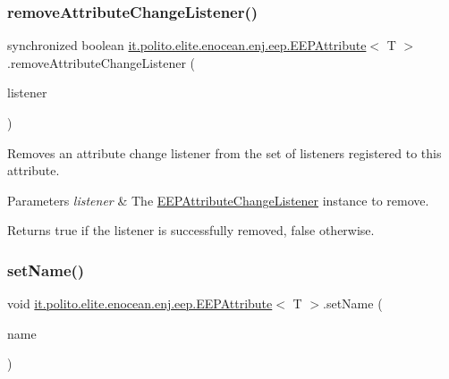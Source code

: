 \subsubsection{\texorpdfstring{remove\+Attribute\+Change\+Listener()}{removeAttributeChangeListener()}}
{\footnotesize\ttfamily synchronized boolean \hyperlink{classit_1_1polito_1_1elite_1_1enocean_1_1enj_1_1eep_1_1_e_e_p_attribute}{it.\+polito.\+elite.\+enocean.\+enj.\+eep.\+E\+E\+P\+Attribute}$<$ T $>$.remove\+Attribute\+Change\+Listener (\begin{DoxyParamCaption}\item[{\hyperlink{interfaceit_1_1polito_1_1elite_1_1enocean_1_1enj_1_1eep_1_1_e_e_p_attribute_change_listener}{E\+E\+P\+Attribute\+Change\+Listener}}]{listener }\end{DoxyParamCaption})}

Removes an attribute change listener from the set of listeners registered to this attribute.


\begin{DoxyParams}{Parameters}
{\em listener} & The \hyperlink{interfaceit_1_1polito_1_1elite_1_1enocean_1_1enj_1_1eep_1_1_e_e_p_attribute_change_listener}{E\+E\+P\+Attribute\+Change\+Listener} instance to remove. \\
\hline
\end{DoxyParams}
\begin{DoxyReturn}{Returns}
true if the listener is successfully removed, false otherwise. 
\end{DoxyReturn}
\hypertarget{classit_1_1polito_1_1elite_1_1enocean_1_1enj_1_1eep_1_1_e_e_p_attribute_a63a7a95832e2f86c9401d4fbaad6cbb5}{}\label{classit_1_1polito_1_1elite_1_1enocean_1_1enj_1_1eep_1_1_e_e_p_attribute_a63a7a95832e2f86c9401d4fbaad6cbb5} 
\subsubsection{\texorpdfstring{set\+Name()}{setName()}}
{\footnotesize\ttfamily void \hyperlink{classit_1_1polito_1_1elite_1_1enocean_1_1enj_1_1eep_1_1_e_e_p_attribute}{it.\+polito.\+elite.\+enocean.\+enj.\+eep.\+E\+E\+P\+Attribute}$<$ T $>$.set\+Name (\begin{DoxyParamCaption}\item[{String}]{name }\end{DoxyParamCaption})}

